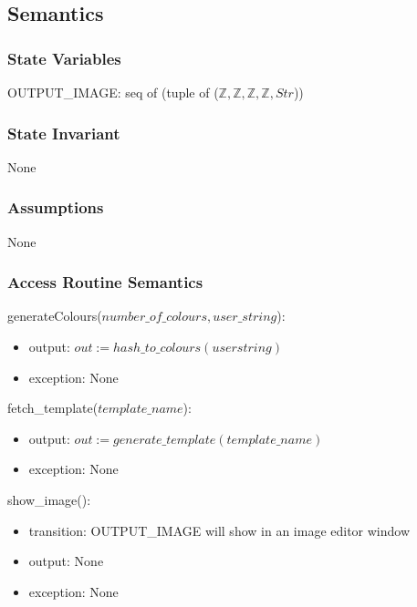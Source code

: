 \documentclass[12pt, titlepage]{article}
\begin{document}
\subsection* {Semantics}

\subsubsection* {State Variables}

OUTPUT\_IMAGE: seq of (tuple of ($\mathbb{Z}, \mathbb{Z}, \mathbb{Z}, \mathbb{Z}, Str$))

\subsubsection* {State Invariant}

None

\subsubsection* {Assumptions}

None

\subsubsection* {Access Routine Semantics}

generateColours($number\_of\_colours, user\_string$):
\begin{itemize}
\item output: $out :=hash\_to\_colours(userstring)$
\item exception: None
\end{itemize}


\hspace{-18pt}fetch\_template($template\_name$):
\begin{itemize}
\item output: $out := generate\_template(template\_name)$
\item exception: None
\end{itemize}


\hspace{-18pt}show\_image():
\begin{itemize}
\item transition: OUTPUT\_IMAGE will show in an image editor window
\item output: None
\item exception: None
\end{itemize}
\end{document}
